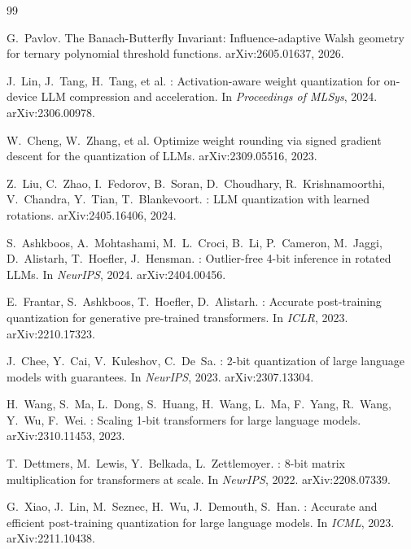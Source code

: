 \documentclass[11pt]{article}
\begin{document}

\begin{thebibliography}{99}

G.~Pavlov.
\newblock The {Banach-Butterfly Invariant}: Influence-adaptive {W}alsh geometry for ternary polynomial threshold functions.
\newblock arXiv:2605.01637, 2026.

J.~Lin, J.~Tang, H.~Tang, et al.
: Activation-aware weight quantization for on-device {LLM} compression and acceleration.
\newblock In \emph{Proceedings of MLSys}, 2024. arXiv:2306.00978.

W.~Cheng, W.~Zhang, et al.
\newblock Optimize weight rounding via signed gradient descent for the quantization of {LLMs}.
\newblock arXiv:2309.05516, 2023.

Z.~Liu, C.~Zhao, I.~Fedorov, B.~Soran, D.~Choudhary, R.~Krishnamoorthi, V.~Chandra, Y.~Tian, T.~Blankevoort.
: {LLM} quantization with learned rotations.
\newblock arXiv:2405.16406, 2024.

S.~Ashkboos, A.~Mohtashami, M.~L.~Croci, B.~Li, P.~Cameron, M.~Jaggi, D.~Alistarh, T.~Hoefler, J.~Hensman.
: Outlier-free 4-bit inference in rotated {LLMs}.
\newblock In \emph{NeurIPS}, 2024. arXiv:2404.00456.

E.~Frantar, S.~Ashkboos, T.~Hoefler, D.~Alistarh.
: Accurate post-training quantization for generative pre-trained transformers.
\newblock In \emph{ICLR}, 2023. arXiv:2210.17323.

J.~Chee, Y.~Cai, V.~Kuleshov, C.~De~Sa.
: 2-bit quantization of large language models with guarantees.
\newblock In \emph{NeurIPS}, 2023. arXiv:2307.13304.

H.~Wang, S.~Ma, L.~Dong, S.~Huang, H.~Wang, L.~Ma, F.~Yang, R.~Wang, Y.~Wu, F.~Wei.
: Scaling 1-bit transformers for large language models.
\newblock arXiv:2310.11453, 2023.

T.~Dettmers, M.~Lewis, Y.~Belkada, L.~Zettlemoyer.
: 8-bit matrix multiplication for transformers at scale.
\newblock In \emph{NeurIPS}, 2022. arXiv:2208.07339.

G.~Xiao, J.~Lin, M.~Seznec, H.~Wu, J.~Demouth, S.~Han.
: Accurate and efficient post-training quantization for large language models.
\newblock In \emph{ICML}, 2023. arXiv:2211.10438.


\end{thebibliography}
\end{document}
